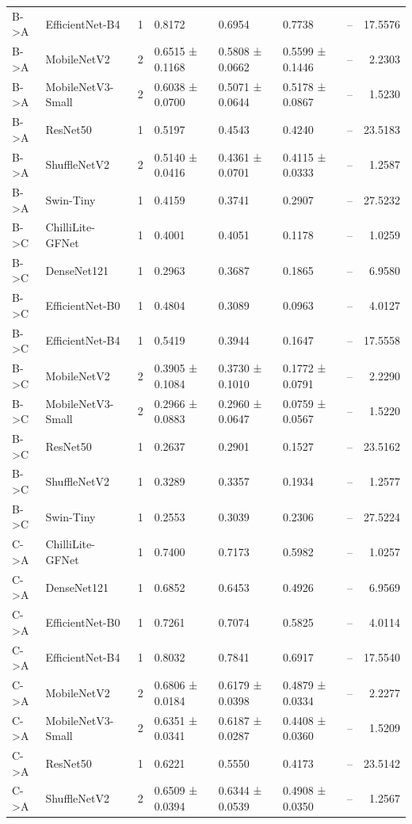 \begin{tabular}{llrllllr}
B->A & EfficientNet-B4 & 1 & 0.8172 & 0.6954 & 0.7738 & -- & 17.5576 \\
B->A & MobileNetV2 & 2 & 0.6515 ± 0.1168 & 0.5808 ± 0.0662 & 0.5599 ± 0.1446 & -- & 2.2303 \\
B->A & MobileNetV3-Small & 2 & 0.6038 ± 0.0700 & 0.5071 ± 0.0644 & 0.5178 ± 0.0867 & -- & 1.5230 \\
B->A & ResNet50 & 1 & 0.5197 & 0.4543 & 0.4240 & -- & 23.5183 \\
B->A & ShuffleNetV2 & 2 & 0.5140 ± 0.0416 & 0.4361 ± 0.0701 & 0.4115 ± 0.0333 & -- & 1.2587 \\
B->A & Swin-Tiny & 1 & 0.4159 & 0.3741 & 0.2907 & -- & 27.5232 \\
B->C & ChilliLite-GFNet & 1 & 0.4001 & 0.4051 & 0.1178 & -- & 1.0259 \\
B->C & DenseNet121 & 1 & 0.2963 & 0.3687 & 0.1865 & -- & 6.9580 \\
B->C & EfficientNet-B0 & 1 & 0.4804 & 0.3089 & 0.0963 & -- & 4.0127 \\
B->C & EfficientNet-B4 & 1 & 0.5419 & 0.3944 & 0.1647 & -- & 17.5558 \\
B->C & MobileNetV2 & 2 & 0.3905 ± 0.1084 & 0.3730 ± 0.1010 & 0.1772 ± 0.0791 & -- & 2.2290 \\
B->C & MobileNetV3-Small & 2 & 0.2966 ± 0.0883 & 0.2960 ± 0.0647 & 0.0759 ± 0.0567 & -- & 1.5220 \\
B->C & ResNet50 & 1 & 0.2637 & 0.2901 & 0.1527 & -- & 23.5162 \\
B->C & ShuffleNetV2 & 1 & 0.3289 & 0.3357 & 0.1934 & -- & 1.2577 \\
B->C & Swin-Tiny & 1 & 0.2553 & 0.3039 & 0.2306 & -- & 27.5224 \\
C->A & ChilliLite-GFNet & 1 & 0.7400 & 0.7173 & 0.5982 & -- & 1.0257 \\
C->A & DenseNet121 & 1 & 0.6852 & 0.6453 & 0.4926 & -- & 6.9569 \\
C->A & EfficientNet-B0 & 1 & 0.7261 & 0.7074 & 0.5825 & -- & 4.0114 \\
C->A & EfficientNet-B4 & 1 & 0.8032 & 0.7841 & 0.6917 & -- & 17.5540 \\
C->A & MobileNetV2 & 2 & 0.6806 ± 0.0184 & 0.6179 ± 0.0398 & 0.4879 ± 0.0334 & -- & 2.2277 \\
C->A & MobileNetV3-Small & 2 & 0.6351 ± 0.0341 & 0.6187 ± 0.0287 & 0.4408 ± 0.0360 & -- & 1.5209 \\
C->A & ResNet50 & 1 & 0.6221 & 0.5550 & 0.4173 & -- & 23.5142 \\
C->A & ShuffleNetV2 & 2 & 0.6509 ± 0.0394 & 0.6344 ± 0.0539 & 0.4908 ± 0.0350 & -- & 1.2567 \\

\end{tabular}
